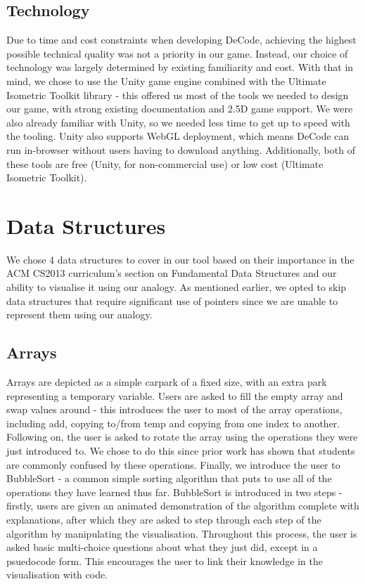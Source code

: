 \documentclass[11pt]{article}
\begin{document}
\subsection{Technology}
Due to time and cost constraints when developing DeCode, achieving the highest possible technical quality was not a priority in our game. Instead, our choice of technology was largely determined by existing familiarity and cost. With that in mind, we chose to use the Unity game engine\cite{technologies} combined with the Ultimate Isometric Toolkit\cite{isometricToolkit} library - this offered us most of the tools we needed to design our game, with strong existing documentation and 2.5D game support. We were also already familiar with Unity, so we needed less time to get up to speed with the tooling. Unity also supports WebGL deployment, which means DeCode can run in-browser without users having to download anything. Additionally, both of these tools are free (Unity, for non-commercial use) or low cost (Ultimate Isometric Toolkit).\par
\section{Data Structures}
We chose 4 data structures to cover in our tool based on their importance in the ACM CS2013 curriculum's section on Fundamental Data Structures\cite{CS2013} and our ability to visualise it using our analogy. As mentioned earlier, we opted to skip data structures that require significant use of pointers since we are unable to represent them using our analogy.
\subsection{Arrays}
Arrays are depicted as a simple carpark of a fixed size, with an extra park representing a temporary variable. Users are asked to fill the empty array and swap values around - this introduces the user to most of the array operations, including add, copying to/from temp and copying from one index to another. Following on, the user is asked to rotate the array using the operations they were just introduced to. We chose to do this since prior work\cite{izuloop} has shown that students are commonly confused by these operations. Finally, we introduce the user to BubbleSort - a common simple sorting algorithm that puts to use all of the operations they have learned thus far. BubbleSort is introduced in two steps - firstly, users are given an animated demonstration of the algorithm complete with explanations, after which they are asked to step through each step of the algorithm by manipulating the visualisation. Throughout this process, the user is asked basic multi-choice questions about what they just did, except in a psuedocode form. This encourages the user to link their knowledge in the visualisation with code.
\end{document}
